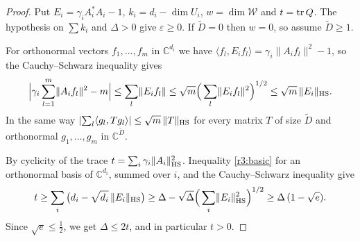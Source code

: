 \begin{proof}
Put $E_i=\gamma_iA_i^*A_i-1$, $k_i=d_i-\dim U_i$, $w=\dim\mathcal W$ and $t=\operatorname{tr} Q$. The hypothesis on $\sum k_i$ and $\Delta>0$ give $\varepsilon\ge0$. If $\widetilde D=0$ then $w=0$, so assume $\widetilde D\ge1$.

For orthonormal vectors $f_1,\dots,f_m$ in $\mathbb C^{d_i}$ we have $\langle f_l,E_if_l\rangle=\gamma_i\lVert A_if_l\rVert^2-1$, so the Cauchy--Schwarz inequality gives
\begin{equation}\label{r3:basic}
\Big\lvert\gamma_i\sum_{l=1}^m\lVert A_if_l\rVert^2-m\Big\rvert\le\sum_l\lVert E_if_l\rVert\le\sqrt m\Big(\sum_l\lVert E_if_l\rVert^2\Big)^{1/2}\le\sqrt m\,\lVert E_i\rVert_{\mathrm{HS}} .
\end{equation}
In the same way $\lvert\sum_l\langle g_l,Tg_l\rangle\rvert\le\sqrt m\,\lVert T\rVert_{\mathrm{HS}}$ for every matrix $T$ of size $\widetilde D$ and orthonormal $g_1,\dots,g_m$ in $\mathbb C^{\widetilde D}$.

By cyclicity of the trace $t=\sum_i\gamma_i\lVert A_i\rVert_{\mathrm{HS}}^2$. Inequality \eqref{r3:basic} for an orthonormal basis of $\mathbb C^{d_i}$, summed over $i$, and the Cauchy--Schwarz inequality give
\[
t\ge\sum_i\big(d_i-\sqrt{d_i}\,\lVert E_i\rVert_{\mathrm{HS}}\big)\ge \Delta-\sqrt \Delta\Big(\sum_i\lVert E_i\rVert_{\mathrm{HS}}^2\Big)^{1/2}\ge \Delta\,(1-\sqrt e).
\]
Since $\sqrt e\le\frac12$, we get $\Delta\le2t$, and in particular $t>0$.


\end{proof}
